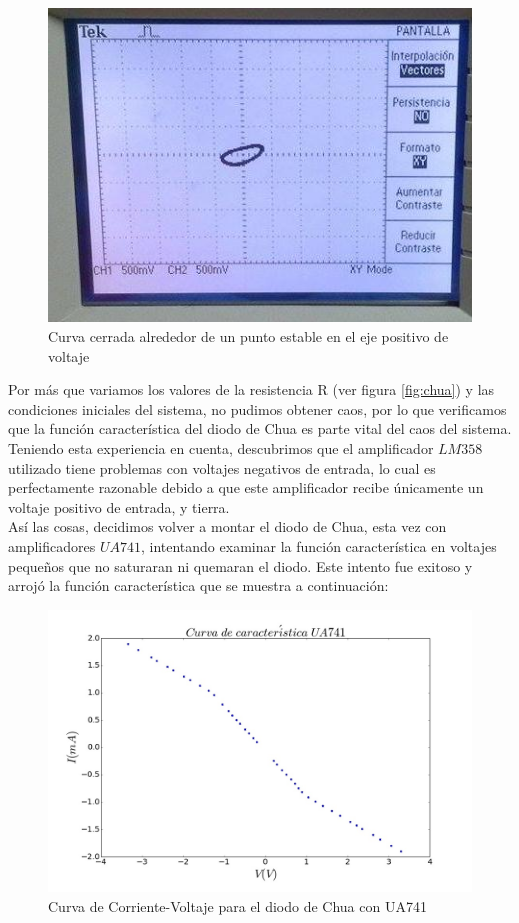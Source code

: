 \documentclass[%
 reprint,
 amsmath,amssymb,
 aps,
]{revtex4-1}
\begin{document}
\begin{figure}
\centering
\includegraphics[width=0.7\linewidth]{"intento1estable"}
\caption{Curva cerrada alrededor de un punto estable en el eje positivo de voltaje}
\label{fig:intento1estable}
\end{figure}

Por más que variamos los valores de la resistencia R (ver figura \ref{fig:chua}) y las condiciones iniciales del sistema, no pudimos obtener caos, por lo que verificamos que la función característica del diodo de Chua es parte vital del caos del sistema.\\

Teniendo esta experiencia en cuenta, descubrimos que el amplificador $LM358$ utilizado tiene problemas con voltajes negativos de entrada, lo cual es perfectamente razonable debido a que este amplificador recibe únicamente un voltaje positivo de entrada, y tierra.\\

Así las cosas, decidimos volver a montar el diodo de Chua, esta vez con amplificadores $UA741$, intentando examinar la función característica en voltajes pequeños que no saturaran ni quemaran el diodo. Este intento fue exitoso y arrojó la función característica que se muestra a continuación:\\ 

\begin{figure}
\centering
\includegraphics[width=0.7\linewidth]{"intento2"}
\caption{Curva de Corriente-Voltaje para el diodo de Chua con UA741}
\label{fig:intento1}
\end{figure}
\end{document}

